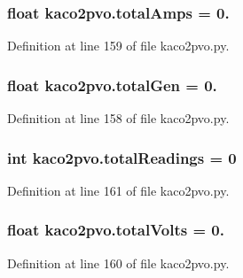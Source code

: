 \hypertarget{namespacekaco2pvo_a0896e4e9c1e2071ff9dad79ca4c1ac90}{}
\subsubsection[{total\+Amps}]{\setlength{\rightskip}{0pt plus 5cm}float kaco2pvo.\+total\+Amps = 0.}\label{namespacekaco2pvo_a0896e4e9c1e2071ff9dad79ca4c1ac90}


Definition at line 159 of file kaco2pvo.\+py.

\hypertarget{namespacekaco2pvo_a6a9f776486bf396d4fc1fe7e58b49504}{}
\subsubsection[{total\+Gen}]{\setlength{\rightskip}{0pt plus 5cm}float kaco2pvo.\+total\+Gen = 0.}\label{namespacekaco2pvo_a6a9f776486bf396d4fc1fe7e58b49504}


Definition at line 158 of file kaco2pvo.\+py.

\hypertarget{namespacekaco2pvo_ae4761990f981a3df61f7d33feda1bd7d}{}
\subsubsection[{total\+Readings}]{\setlength{\rightskip}{0pt plus 5cm}int kaco2pvo.\+total\+Readings = 0}\label{namespacekaco2pvo_ae4761990f981a3df61f7d33feda1bd7d}


Definition at line 161 of file kaco2pvo.\+py.

\hypertarget{namespacekaco2pvo_a494df69766f24f66f1cc08bd7c12391e}{}
\subsubsection[{total\+Volts}]{\setlength{\rightskip}{0pt plus 5cm}float kaco2pvo.\+total\+Volts = 0.}\label{namespacekaco2pvo_a494df69766f24f66f1cc08bd7c12391e}


Definition at line 160 of file kaco2pvo.\+py.


